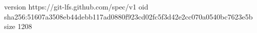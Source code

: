version https://git-lfs.github.com/spec/v1
oid sha256:51607a3508eb44debb117ad0880f923cd02fc5f3d42e2cc070a0540bc7623e5b
size 1208
